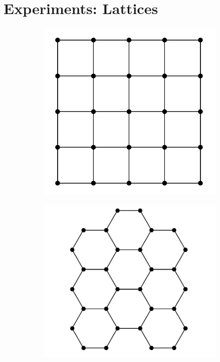 \chapter{Experiments: Lattices}
\label{ch:regular-tilings}

\begin{figure}[t]
  \centering
  \begin{subfigure}{.32\textwidth}
    \centering
    \includegraphics[width=1.0\linewidth]{figures/square.png}
    \label{fig:rt-square}
  \end{subfigure}
  \begin{subfigure}{.32\textwidth}
    \centering
    \includegraphics[width=1.0\linewidth]{figures/hex.png}

\end{subfigure}
\end{figure}
